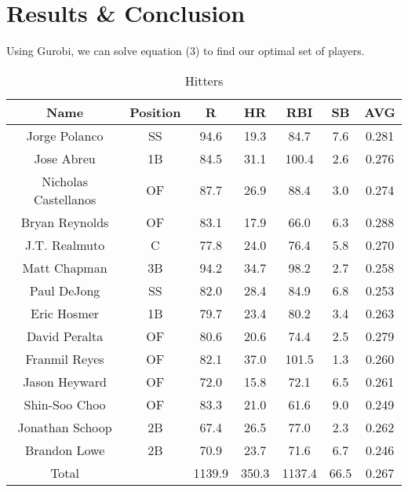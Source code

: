 \documentclass{article}
\begin{document}
\section*{Results \& Conclusion}
Using Gurobi, we can solve equation (3) to find our optimal set of players. 

\begin{table}[ht] \caption{Hitters}
\centering
\begin{tabular}{c c c c c c c}
\hline\hline
Name & Position & R & HR & RBI & SB & AVG \\
\hline
Jorge Polanco & SS & 94.6 & 19.3 & 84.7 & 7.6 & 0.281 \\
Jose Abreu	& 1B & 84.5 & 31.1 & 100.4 & 2.6 & 0.276 \\
Nicholas Castellanos & OF & 87.7 & 26.9 & 88.4 & 3.0 & 0.274 \\
Bryan Reynolds & OF & 83.1 & 17.9 & 66.0 & 6.3 & 0.288 \\
J.T. Realmuto & C & 77.8 & 24.0 & 76.4 & 5.8 & 0.270 \\
Matt Chapman & 3B & 94.2 & 34.7 & 98.2 & 2.7 & 0.258 \\
Paul DeJong & SS & 82.0 & 28.4 & 84.9 & 6.8 & 0.253 \\
Eric Hosmer & 1B & 79.7 & 23.4 & 80.2 & 3.4 & 0.263 \\
David Peralta & OF & 80.6 & 20.6 & 74.4 & 2.5 & 0.279 \\
Franmil Reyes & OF & 82.1 & 37.0 & 101.5 & 1.3 & 0.260 \\
Jason Heyward & OF & 72.0 & 15.8 & 72.1 & 6.5 & 0.261 \\
Shin-Soo Choo & OF & 83.3 & 21.0 & 61.6 & 9.0 & 0.249 \\
Jonathan Schoop & 2B & 67.4 & 26.5 & 77.0 & 2.3 & 0.262 \\
Brandon Lowe & 2B & 70.9 & 23.7 & 71.6 & 6.7 & 0.246 \\
\hline
Total &  & 1139.9 & 350.3 & 1137.4 & 66.5 & 0.267 \\

\hline
\end{tabular}
\end{table}
\end{document}
